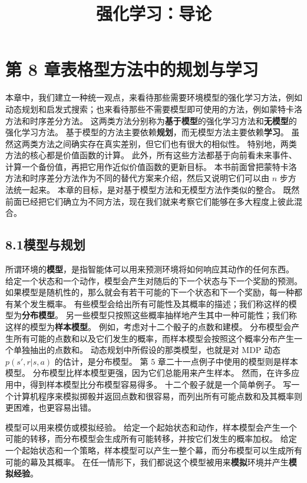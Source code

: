 \documentclass[UTF8,12pt,a4paper,fontset=fandol]{ctexart}
\title{强化学习：导论}
\author{}
\date{}
\begin{document}
\maketitle

\section*{第 8 章\quad 表格型方法中的规划与学习}

本章中，我们建立一种统一观点，来看待那些需要环境模型的强化学习方法，例如动态规划和启发式搜索；也来看待那些不需要模型即可使用的方法，例如蒙特卡洛方法和时序差分方法。
这两类方法分别称为\textbf{基于模型}的强化学习方法和\textbf{无模型}的强化学习方法。
基于模型的方法主要依赖\textbf{规划}，而无模型方法主要依赖\textbf{学习}。
虽然这两类方法之间确实存在真实差别，但它们也有很大的相似性。
特别地，两类方法的核心都是价值函数的计算。
此外，所有这些方法都基于向前看未来事件、计算一个备份值，再把它用作近似价值函数的更新目标。
本书前面曾把蒙特卡洛方法和时序差分方法作为不同的替代方案来介绍，然后又说明它们可以由 $n$ 步方法统一起来。
本章的目标，是对基于模型方法和无模型方法作类似的整合。
既然前面已经把它们确立为不同方法，现在我们就来考察它们能够在多大程度上彼此混合。

\subsection*{8.1\quad 模型与规划}

所谓环境的\textbf{模型}，是指智能体可以用来预测环境将如何响应其动作的任何东西。
给定一个状态和一个动作，模型会产生对随后的下一个状态与下一个奖励的预测。
如果模型是随机性的，那么就会有若干可能的下一个状态和下一个奖励，每一种都有某个发生概率。
有些模型会给出所有可能性及其概率的描述；我们称这样的模型为\textbf{分布模型}。
另一些模型只按照这些概率抽样地产生其中一种可能性；我们称这样的模型为\textbf{样本模型}。
例如，考虑对十二个骰子的点数和建模。
分布模型会产生所有可能的点数和以及它们发生的概率，而样本模型会按照这个概率分布产生一个单独抽出的点数和。
动态规划中所假设的那类模型，也就是对 MDP 动态 $p(s',r|s,a)$ 的估计，是分布模型。
第 5 章二十一点例子中使用的模型则是样本模型。
分布模型比样本模型更强，因为它们总能用来产生样本。
然而，在许多应用中，得到样本模型比分布模型容易得多。
十二个骰子就是一个简单例子。
写一个计算机程序来模拟掷骰并返回点数和很容易，而列出所有可能点数和及其概率则更困难，也更容易出错。

模型可以用来模仿或模拟经验。
给定一个起始状态和动作，样本模型会产生一个可能的转移，而分布模型会生成所有可能转移，并按它们发生的概率加权。
给定一个起始状态和一个策略，样本模型可以产生一整个幕，而分布模型可以生成所有可能的幕及其概率。
在任一情形下，我们都说这个模型被用来\textbf{模拟}环境并产生\textbf{模拟经验}。
\end{document}
